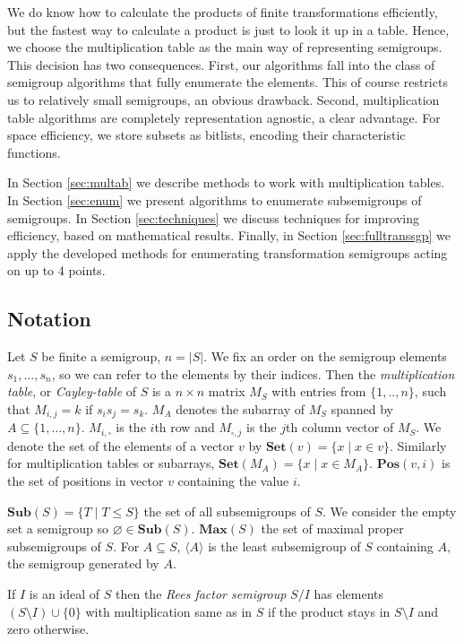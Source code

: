 \documentclass{amsart}
\newcommand{\Sub}{\mathbf{Sub}}
\newcommand{\Set}{\mathbf{Set}}
\newcommand{\Pos}{\mathbf{Pos}}
\newcommand{\Max}{\mathbf{Max}}
\theoremstyle{plain}
\theoremstyle{definition}
\begin{document}
We do know how to calculate the products of finite transformations efficiently, but the fastest way to calculate a product is just to look it up in a table.
Hence, we choose the multiplication table as the main way of representing semigroups.
This decision has two consequences. 
First, our algorithms fall into the class of semigroup algorithms that fully enumerate the elements.
This of course  restricts us to relatively small semigroups, an obvious drawback.
Second, multiplication table algorithms are completely representation agnostic, a clear advantage.
For space efficiency, we store subsets as bitlists, encoding their characteristic functions.


In Section \ref{sec:multab} we describe methods to work with multiplication tables.
In Section \ref{sec:enum} we present algorithms to enumerate subsemigroups of semigroups.
In Section \ref{sec:techniques} we discuss techniques for improving efficiency, based on mathematical results.
Finally, in Section \ref{sec:fulltranssgp} we apply the developed methods for enumerating transformation semigroups acting on up to 4 points.

\subsection{Notation}

Let $S$ be finite a semigroup, $n=|S|$.
We fix an order on the semigroup elements $s_1,\ldots, s_n$, so we can refer to the elements by their indices. 
Then the  \emph{multiplication table}, or \emph{Cayley-table} of $S$ is a $n\times n$ matrix $M_S$ with entries from $\{1,..,n\}$, such that $M_{i,j}=k$ if $s_is_j=s_k$.
$M_A$ denotes the subarray of $M_S$ spanned by $A\subseteq\{1,\ldots,n\}$.
$M_{i,\square}$ is the $i$th row and $M_{\square,j}$ is the $j$th column vector of $M_S$.
We denote the set of the elements of a vector $v$ by $\Set(v)=\{x\mid x\in v\}$.
Similarly for multiplication tables or subarrays, $\Set(M_A)=\{x\mid x\in M_A\}$.
$\Pos(v,i)$ is the set of positions in vector $v$ containing the value $i$.

$\Sub(S)=\big\{T\mid T\leq S \big\}$ the set of all subsemigroups of $S$.
We consider the empty set a semigroup so $\varnothing\in\Sub(S)$.
$\Max(S)$ the set of maximal proper subsemigroups of $S$.
For $A\subseteq S$, $\langle A\rangle$ is the least subsemigroup of $S$ containing $A$, the semigroup generated by $A$. 

If $I$ is an ideal of $S$ then the \emph{Rees factor semigroup} $S/I$ has elements $(S\setminus I)\cup\{0\}$ with multiplication same as in $S$ if the product stays in $S\setminus I$ and zero otherwise.
\end{document}
